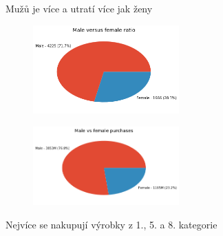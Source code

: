 \documentclass[11pt]{beamer}
\begin{document}
\begin{frame}{Mužů je více a utratí více jak ženy}
\begin{figure}
	\includegraphics[width=0.5\textwidth,keepaspectratio]{black-friday_10_0}
\end{figure}
\begin{figure}
	\includegraphics[width=0.5\textwidth,keepaspectratio]{black-friday_11_0}
\end{figure}
\end{frame}

\begin{frame}{Nejvíce se nakupují výrobky z 1., 5. a 8. kategorie}
\begin{figure}
	\hfill
	\hfill
	\hfill
\end{figure}
\end{frame}
\end{document}
